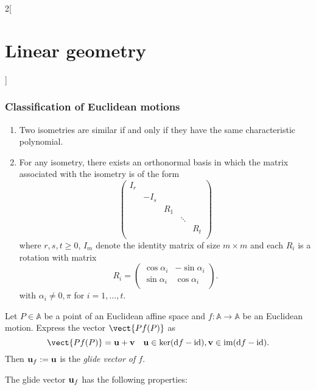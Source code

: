 \documentclass[../../../main.tex]{subfiles}
\begin{document}
\begin{multicols}{2}[\section{Linear geometry}]
    \subsubsection*{Classification of Euclidean motions}
    \begin{theorem}
        \hfill
        \begin{enumerate}
            \item Two isometries are similar if and only if they have the same characteristic polynomial.
            \item For any isometry, there exists an orthonormal basis in which the matrix associated with the isometry is of the form  $$\begin{pmatrix}
                          I_r &      &     &        &     \\
                              & -I_s &     &        &     \\
                              &      & R_1 &        &     \\
                              &      &     & \ddots &     \\
                              &      &     &        & R_t \\
                      \end{pmatrix}$$ where $r,s,t\geq 0$, $I_m$ denote the identity matrix of size $m\times m$ and each $R_i$ is a rotation with matrix $$R_i=\begin{pmatrix}
                          \cos\alpha_i & -\sin\alpha_i \\
                          \sin\alpha_i & \cos\alpha_i  \\
                      \end{pmatrix}.$$ with $\alpha_i\ne0,\pi$ for $i=1,\ldots,t$.
        \end{enumerate}
    \end{theorem}
    \begin{definition}
        Let $P\in\mathbb{A}$ be a point of an Euclidean affine space and $f:\mathbb{A}\rightarrow\mathbb{A}$ be an Euclidean motion. Express the vector $\vect{Pf(P)}$ as $$\vect{Pf(P)}=\mathblack{u}+\mathblack{v}\quad\mathblack{u}\in\ker(\dd f-\id),\mathblack{v}\in\im(\dd f-\id).$$ Then $\vb{u}_f:=\vb{u}$ is the \textit{glide vector of $f$}.
    \end{definition}
    \begin{prop}
        The glide vector $\vb{u}_f$ has the following properties:
        \begin{itemize}

\end{itemize}
\end{prop}
\end{multicols}
\end{document}
